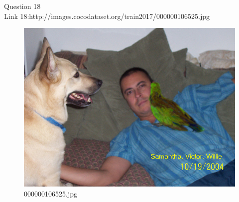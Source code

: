 Question 18\\
Link 18:http://images.cocodataset.org/train2017/000000106525.jpg
    \begin{figure}[h]
        \centering
        \includegraphics[width=0.8\linewidth]{../image set/easy/000000106525.jpg}
        \caption{000000106525.jpg}
    \end{figure}
